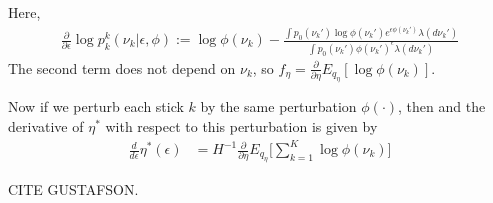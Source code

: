 \documentclass[a4paper]{article}
\begin{document}
Here,
\begin{align}
  \frac{\partial}{\partial \epsilon} \log p_k^k(\nu_k | \epsilon, \phi) := \log \phi(\nu_k) -
    \frac{\int p_0(\nu_k')\log\phi(\nu_k')e^{\epsilon\phi(\nu_k')} \lambda(d\nu_k')}{\int p_0(\nu_k')\phi(\nu_k')^\epsilon \lambda(d\nu_k')}
\end{align}
The second term does not depend on $\nu_k$, so $f_\eta = \frac{\partial}{\partial \eta} E_{q_\eta}[\log \phi(\nu_k)]$.

Now if we perturb each stick $k$ by the same perturbation $\phi(\cdot)$, then
and the derivative of $\eta^*$ with respect to this perturbation is given by
\begin{align}
   \frac{d}{d\epsilon}\eta^*(\epsilon) &=
   H^{-1}\frac{\partial}{\partial \eta} E_{q_\eta}\Big[\sum_{k = 1}^K \log \phi(\nu_k)\Big]
  \label{eq:sensitivity_exp_pert}
\end{align}

CITE GUSTAFSON. 
\end{document}
